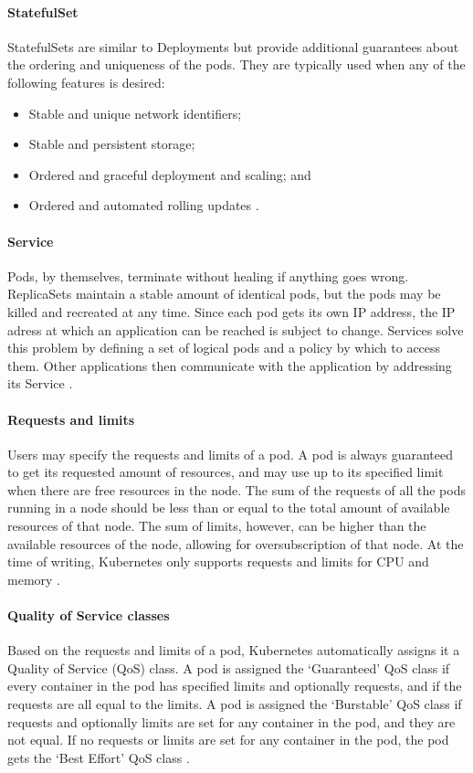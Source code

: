 \paragraph{StatefulSet}
StatefulSets are similar to Deployments but provide additional guarantees about the ordering and uniqueness of the pods. They are typically used when any of the following features is desired:
\begin{itemize}
    \item Stable and unique network identifiers;
    \item Stable and persistent storage;
    \item Ordered and graceful deployment and scaling; and
    \item Ordered and automated rolling updates \cite{Kubernetes-StatefulSet}.
\end{itemize}

\paragraph{Service}
Pods, by themselves, terminate without healing if anything goes wrong. ReplicaSets maintain a stable amount of identical pods, but the pods may be killed and recreated at any time. Since each pod gets its own IP address, the IP adress at which an application can be reached is subject to change. Services solve this problem by defining a set of logical pods and a policy by which to access them. Other applications then communicate with the application by addressing its Service \citep{Kubernetes-Service}.

\paragraph{Requests and limits}
Users may specify the requests and limits of a pod. A pod is always guaranteed to get its requested amount of resources, and may use up to its specified limit when there are free resources in the node. The sum of the requests of all the pods running in a node should be less than or equal to the total amount of available resources of that node. The sum of limits, however, can be higher than the available resources of the node, allowing for oversubscription of that node. At the time of writing, Kubernetes only supports requests and limits for CPU and memory \citep{requestlimit}.

\paragraph{Quality of Service classes}
Based on the requests and limits of a pod, Kubernetes automatically assigns it a Quality of Service (QoS) class. A pod is assigned the `Guaranteed' QoS class if every container in the pod has specified limits and optionally requests, and if the requests are all equal to the limits. A pod is assigned the `Burstable' QoS class if requests and optionally limits are set for any container in the pod, and they are not equal. If no requests or limits are set for any container in the pod, the pod gets the `Best Effort' QoS class \citep{QoS}.

